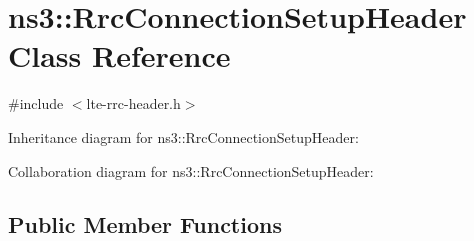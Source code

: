 \hypertarget{classns3_1_1RrcConnectionSetupHeader}{}\section{ns3\+:\+:Rrc\+Connection\+Setup\+Header Class Reference}
\label{classns3_1_1RrcConnectionSetupHeader}


{\ttfamily \#include $<$lte-\/rrc-\/header.\+h$>$}



Inheritance diagram for ns3\+:\+:Rrc\+Connection\+Setup\+Header\+:


Collaboration diagram for ns3\+:\+:Rrc\+Connection\+Setup\+Header\+:
\subsection*{Public Member Functions}
